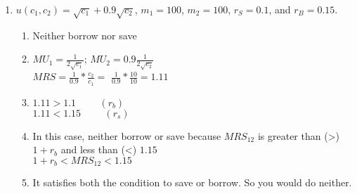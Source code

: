\documentclass[11pt]{article}
\begin{document}
\begin{enumerate}
\begin{enumerate}
        \item $u(c_{1},c_{2})=\sqrt{c_{1}}+0.9\sqrt{c_{2}}$, $m_{1}=100$, $m_{2}=100$, $r_{S}=0.1$, and $r_{B}=0.15$.
        \begin{enumerate}
            \item Neither borrow nor save
            \item $MU_1 = \frac{1}{2\sqrt{c_1}}$; $MU_2 = 0.9\frac{1}{2\sqrt{c_2}}$\\
            $MRS = \frac{1}{0.9} * \frac{c_2}{c_1} = $ $\frac{1}{0.9} *\frac{10}{10} = 1.11$
            \item $1.11 > 1.1 \hspace{1cm}(r_b)$
            \\$1.11<1.15\hspace{1cm}(r_s)$
            \item In this case, neither borrow or save because $MRS_{12}$ is greater than (>) $1+r_b$ and less than (<) $1.15$\\
            $1+r_b < MRS_{12} < 1.15$
            \item It satisfies both the condition to save or borrow. So you would do neither.
        \end{enumerate}
    \end{enumerate}


\end{enumerate}
\end{document}
